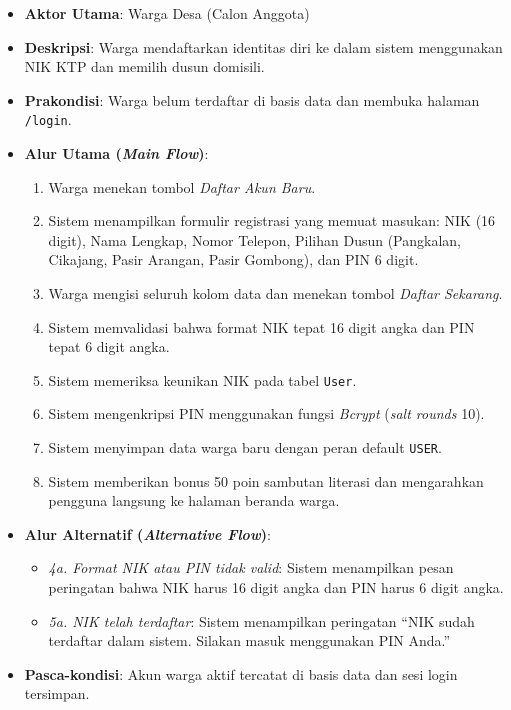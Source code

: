 \documentclass[
  indonesian,
  12pt,
]{report}
\providecommand{\tightlist}{%
  \setlength{\itemsep}{0pt}\setlength{\parskip}{0pt}}
\begin{document}
\begin{itemize}
\tightlist
\item
  \textbf{Aktor Utama}: Warga Desa (Calon Anggota)
\item
  \textbf{Deskripsi}: Warga mendaftarkan identitas diri ke dalam sistem
  menggunakan NIK KTP dan memilih dusun domisili.
\item
  \textbf{Prakondisi}: Warga belum terdaftar di basis data dan membuka
  halaman \texttt{/login}.
\item
  \textbf{Alur Utama (\emph{Main Flow})}:

  \begin{enumerate}
  \def\labelenumi{\arabic{enumi}.}
  \tightlist
  \item
    Warga menekan tombol \emph{Daftar Akun Baru}.
  \item
    Sistem menampilkan formulir registrasi yang memuat masukan: NIK (16
    digit), Nama Lengkap, Nomor Telepon, Pilihan Dusun (Pangkalan,
    Cikajang, Pasir Arangan, Pasir Gombong), dan PIN 6 digit.
  \item
    Warga mengisi seluruh kolom data dan menekan tombol \emph{Daftar
    Sekarang}.
  \item
    Sistem memvalidasi bahwa format NIK tepat 16 digit angka dan PIN
    tepat 6 digit angka.
  \item
    Sistem memeriksa keunikan NIK pada tabel \texttt{User}.
  \item
    Sistem mengenkripsi PIN menggunakan fungsi \emph{Bcrypt} (\emph{salt
    rounds} 10).
  \item
    Sistem menyimpan data warga baru dengan peran default \texttt{USER}.
  \item
    Sistem memberikan bonus 50 poin sambutan literasi dan mengarahkan
    pengguna langsung ke halaman beranda warga.
  \end{enumerate}
\item
  \textbf{Alur Alternatif (\emph{Alternative Flow})}:

  \begin{itemize}
  \tightlist
  \item
    \emph{4a. Format NIK atau PIN tidak valid}: Sistem menampilkan pesan
    peringatan bahwa NIK harus 16 digit angka dan PIN harus 6 digit
    angka.
  \item
    \emph{5a. NIK telah terdaftar}: Sistem menampilkan peringatan ``NIK
    sudah terdaftar dalam sistem. Silakan masuk menggunakan PIN Anda.''
  \end{itemize}
\item
  \textbf{Pasca-kondisi}: Akun warga aktif tercatat di basis data dan
  sesi login tersimpan.
\end{itemize}
\end{document}
